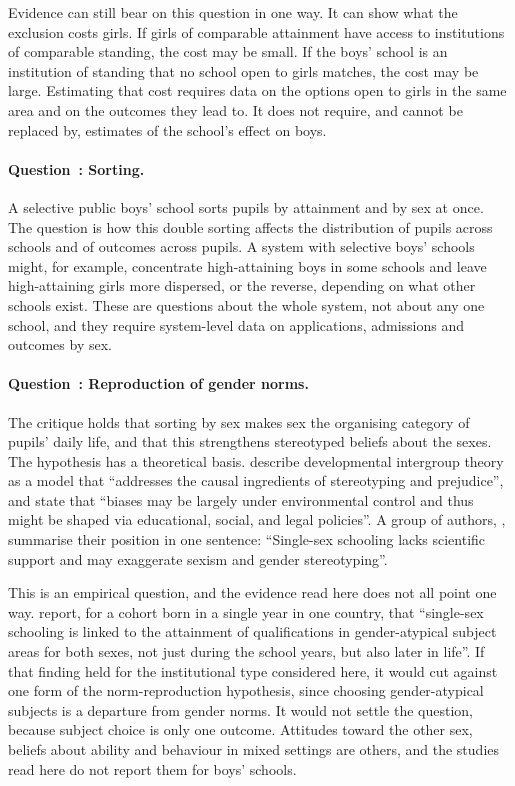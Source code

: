 \documentclass[11pt]{article}
\newcommand{\srcq}[2]{``#2''}
\newcounter{eqq}
\newcommand{\eqq}[1]{\refstepcounter{eqq}\paragraph{Question~\theeqq: #1.}}
\begin{document}
Evidence can still bear on this question in one way. It can show what the exclusion costs girls. If girls of comparable attainment have access to institutions of comparable standing, the cost may be small. If the boys' school is an institution of standing that no school open to girls matches, the cost may be large. Estimating that cost requires data on the options open to girls in the same area and on the outcomes they lead to. It does not require, and cannot be replaced by, estimates of the school's effect on boys.

\eqq{Sorting}\label{eq:sorting}
A selective public boys' school sorts pupils by attainment and by sex at once. The question is how this double sorting affects the distribution of pupils across schools and of outcomes across pupils. A system with selective boys' schools might, for example, concentrate high-attaining boys in some schools and leave high-attaining girls more dispersed, or the reverse, depending on what other schools exist. These are questions about the whole system, not about any one school, and they require system-level data on applications, admissions and outcomes by sex.

\eqq{Reproduction of gender norms}\label{eq:norms}
The critique holds that sorting by sex makes sex the organising category of pupils' daily life, and that this strengthens stereotyped beliefs about the sexes. The hypothesis has a theoretical basis. \citet{bigler2007} describe developmental intergroup theory as a model that \srcq{bigler2007}{addresses the causal ingredients of stereotyping and prejudice}, and state that \srcq{bigler2007}{biases may be largely under environmental control and thus might be shaped via educational, social, and legal policies}. A group of authors, \citet{halpern2011}, summarise their position in one sentence: \srcq{halpern2011}{Single-sex schooling lacks scientific support and may exaggerate sexism and gender stereotyping}.

This is an empirical question, and the evidence read here does not all point one way. \citet{sullivan2010} report, for a cohort born in a single year in one country, that \srcq{sullivan2010}{single-sex schooling is linked to the attainment of qualifications in gender-atypical subject areas for both sexes, not just during the school years, but also later in life}. If that finding held for the institutional type considered here, it would cut against one form of the norm-reproduction hypothesis, since choosing gender-atypical subjects is a departure from gender norms. It would not settle the question, because subject choice is only one outcome. Attitudes toward the other sex, beliefs about ability and behaviour in mixed settings are others, and the studies read here do not report them for boys' schools.
\end{document}
